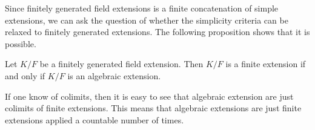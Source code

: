 \documentclass[a4paper]{article}
\begin{document}
Since finitely generated field extensions is a finite concatenation of simple extensions, we can ask the question of whether the simplicity criteria can be relaxed to finitely generated extensions. The following proposition shows that it is possible. 

\begin{prp}{}{} Let $K/F$ be a finitely generated field extension. Then $K/F$ is a finite extension if and only if $K/F$ is an algebraic extension. 
\end{prp}

If one know of colimits, then it is easy to see that algebraic extension are just colimits of finite extensions. This means that algebraic extensions are just finite extensions applied a countable number of times. 
\end{document}
